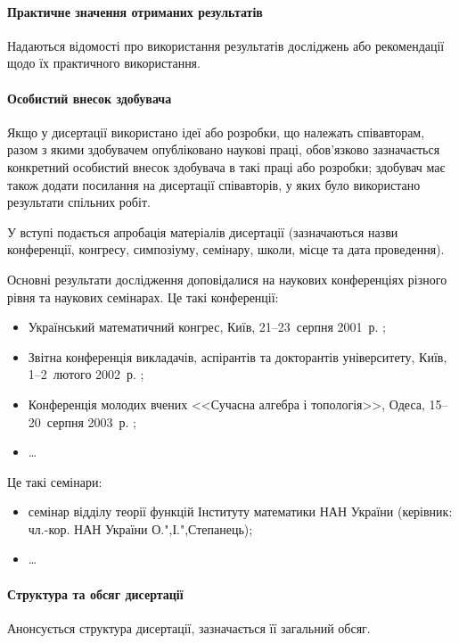 \paragraph{Практичне значення отриманих результатів}

Надаються відомості про використання результатів досліджень
або рекомендації щодо їх практичного використання.

\paragraph{Особистий внесок здобувача}

Якщо у дисертації використано ідеї або розробки,
що належать співавторам, разом з якими здобувачем опубліковано наукові праці,
обов'язково зазначається
конкретний особистий внесок здобувача в такі праці або розробки;
здобувач має також додати посилання на дисертації співавторів,
у яких було використано результати спільних робіт.

\begin{approval}
У вступі подається апробація матеріалів дисертації
(зазначаються назви конференції, конгресу, симпозіуму, семінару, школи,
місце та дата проведення).

Основні результати дослідження доповідалися на наукових
конференціях різного рівня та наукових семінарах. Це такі
конференції:
\begin{itemize}
\item Український математичний конгрес, Київ, 21--23~серпня
2001~р. ;

\item Звітна конференція викладачів, аспірантів та докторантів університету,
  Київ, 1--2~лютого 2002~р. ;

\item Конференція молодих вчених <<Сучасна алгебра і топологія>>,
  Одеса, 15--20~серпня 2003~р. ;

\item \ldots
\end{itemize}
Це такі семінари:
\begin{itemize}
\item семінар відділу теорії функцій Інституту математики НАН
України (керівник: чл.-кор. НАН України О.",І.",Степанець);

\item \ldots
\end{itemize}
\end{approval}

\paragraph{Структура та обсяг дисертації}

Анонсується структура дисертації, зазначається її загальний обсяг.
